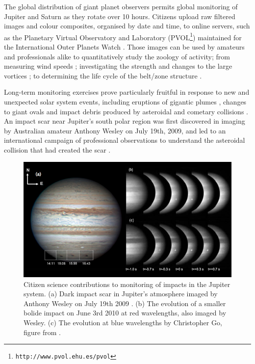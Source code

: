 \documentclass{ar2e}
\begin{document}
The global distribution of giant planet observers permits global monitoring of
Jupiter and Saturn as they rotate over 10 hours. Citizens upload raw filtered
images and colour composites, organised by date and time, to online servers,
such as the Planetary Virtual Observatory and Laboratory
(PVOL\footnote{\texttt{http://www.pvol.ehu.es/pvol}}) maintained for the
International Outer Planets Watch \citep[IOPW][]{10hueso}.  Those images can be
used by amateurs and professionals alike to quantitatively study the zoology of
activity; from measuring wind speeds \citep{08sanchez}; investigating the
strength and changes to the large vortices \citep[e.g., the 2006 reddening of
Oval BA,][]{06simon-miller}; to determining the life cycle of the belt/zone
structure \citep{96sanchez, 11fletcher}. 

Long-term monitoring exercises prove particularly fruitful in response to new
and unexpected solar system events, including eruptions of gigantic plumes
\citep{08sanchez, 11fletcher}, changes to giant ovals \citep{06simon-miller} and
impact debris produced by asteroidal and cometary collisions \citep{10hammel}. 
An impact scar near Jupiter's south polar region was first discovered in imaging
by Australian amateur Anthony Wesley on July 19th, 2009, and led to an
international campaign of professional observations to understand the asteroidal
collision that had created the scar \citep[e.g.,][]{10depater,11orton}.  

\begin{figure}[!ht]
\centering\includegraphics[width=\linewidth]{figs/jupiter-impacts.png}
\caption{Citizen science contributions to monitoring of impacts in the Jupiter
system. (a) Dark impact scar in Jupiter's atmosphere imaged by Anthony
Wesley on July 19th 2009 \citep{Sanchez-LavegaEtal2010}. (b) The
evolution of a smaller bolide impact on June 3rd 2010 at red
wavelengths, also imaged by Wesley. (c) The evolution at blue
wavelengths by Christopher Go, figure from \citet{HuesoEtal2010}.}
\label{fig:jupiter-impacts}
\end{figure}
\end{document}
